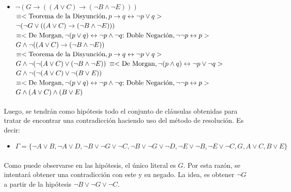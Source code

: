\documentclass{article}
\begin{document}
\begin{itemize}
\begin{itemize}
\begin{itemize}
		\item $\neg( G \rightarrow ((A \lor C) \rightarrow (\neg B \land \neg E)))$ \\
				$\equiv < \text{Teorema de la Disyunci\'on},  
					p \rightarrow q \leftrightarrow \neg p \lor q > \\$
				$ \neg(\neg G \lor ((A \lor C) \rightarrow (\neg B \land \neg E)))\\$
				$ \equiv <\text{De Morgan}, 
					\neg(p \lor q) \leftrightarrow \neg p \land \neg q \text {; Doble Negaci\'on}, \neg \neg p \leftrightarrow p> \\ $
				$ G \land \neg((A \lor C) \rightarrow (\neg B \land \neg E))\\$
				$\equiv < \text{Teorema de la Disyunci\'on},  
					p \rightarrow q \leftrightarrow \neg p \lor q > \\$
				$ G \land \neg(\neg(A \lor C) \lor (\neg B \land \neg E))\\$
				$\equiv <\text{De Morgan}, 
					\neg(p \land q) \leftrightarrow \neg p \lor \neg q> \\$
				$ G \land \neg(\neg(A \lor C) \lor \neg(B \lor E))\\$
				$ \equiv <\text{De Morgan}, 
					\neg(p \lor q) \leftrightarrow \neg p \land \neg q \text {; Doble Negaci\'on}, \neg \neg p \leftrightarrow p> \\ $
				$ G \land (A \lor C) \land (B \lor E)\\$

		\end{itemize}				 
		
		\paragraph{}
		Luego, se tendr\'an como hip\'otesis todo el conjunto de cl\'ausulas obtenidas para tratar de encontrar una contradicci\'on haciendo uso del m\'etodo de resoluci\'on. Es decir:
		
		\begin{itemize}
		\item $\Gamma = \{\neg A \lor B,\neg A \lor D,\neg B \lor \neg G \lor \neg C ,\neg B \lor \neg G \lor \neg D,\neg E \lor \neg B, \neg E \lor \neg C, G, A \lor C, B \lor E\} $
		\end{itemize}
		
		\paragraph{}
		Como puede observarse en las hip\'otesis, el \'unico literal es $G$. Por esta raz\'on, se intentar\'a obtener una contradicci\'on con este y su negado. La idea, es obtener $\neg G$ a partir de la hip\'otesis $\neg B \lor \neg G \lor \neg C$. 
		

\end{itemize}
\end{itemize}
\end{document}
